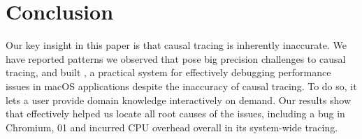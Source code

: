 \section{Conclusion} \label{sec:conclusion}
Our key insight in this paper is that causal tracing is inherently
inaccurate. We have reported patterns we observed that pose big precision
challenges to causal tracing, and built \xxx, a practical system for
effectively debugging performance issues in macOS applications despite the
inaccuracy of causal tracing.  To do so, it lets a user provide domain
knowledge interactively on demand. Our results show that \xxx effectively
helped us locate all root causes of the issues, including a bug in Chromium,
01 and incurred \cpuoverhead CPU overhead overall in its system-wide tracing.
\clearpage
